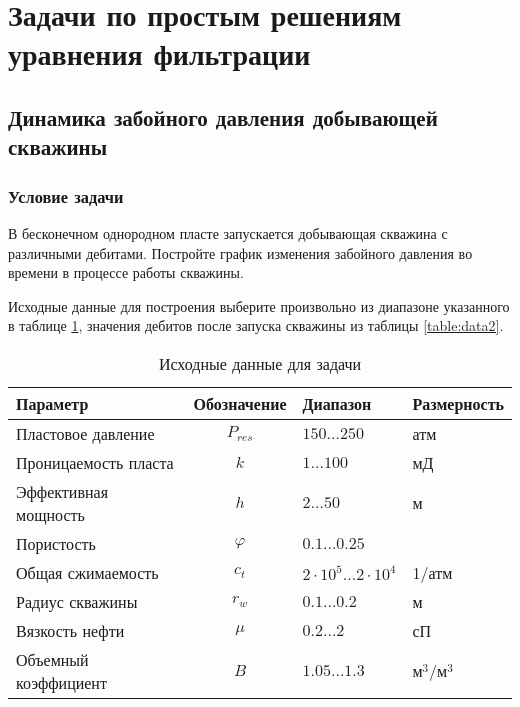 
\section{Задачи по простым решениям уравнения фильтрации}

\subsection{Динамика забойного давления добывающей скважины}

\subsubsection{Условие задачи}

В бесконечном однородном пласте запускается добывающая скважина с различными дебитами. 
Постройте график изменения забойного давления во времени в процессе работы скважины.

Исходные данные для построения выберите произвольно из диапазоне указанного в таблице \ref{table:data1}, значения дебитов после запуска скважины из таблицы \ref{table:data2}. 

\begin{table}[h!]
	\ttabbox
	{
		\caption{Исходные данные для задачи}
		\label{table:data1}
	}
	{
		\begin{tabular}{|l|c|l|l|}
			\hline
		\rowcolor{lightgray}	Параметр& Обозначение &Диапазон &Размерность \\
			\hline
			Пластовое давление&  $P_{res} $&$ 150 \dots 250$ &атм \\
			\hline
			Проницаемость пласта &$k $&$ 1 \dots 100$& мД  \\
			\hline
			Эффективная мощность & $h $&$ 2\dots50$ &м  \\
			\hline
			Пористость & $\varphi $&$ 0.1 \dots 0.25$&  \\
			\hline
			Общая сжимаемость& $c_{t} $&$ 2\cdot 10^5 \dots2\cdot 10^4 $ & 1/атм  \\
			\hline
			Радиус скважины &$r_{w} $&$ 0.1\dots0.2 $& м  \\
			\hline
			Вязкость нефти& $\mu $&$ 0.2\dots2$& сП  \\
			\hline
			Объемный коэффициент   &$B $&$ 1.05\dots 1.3$& м$^3$/м$^3$  \\
			\hline
		\end{tabular}
	
	}
\end{table}


